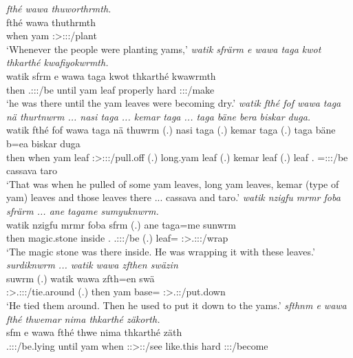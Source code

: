 \begin{exe}
	\emph{fthé wawa thuworthrmth.}\\
	\gll fthé wawa thuthrmth\\ 
	when yam \Stpl:\Sbj>\Stpl:\Obj:\Pst:\Dur/plant\\
	\trans `Whenever the people were planting yams,'
	\emph{watik sfrärm e wawa taga kwot thkarthé kwafiyokwrmth.}\\
	\gll watik sfrm e wawa taga kwot thkarthé kwawrmth\\ 
	then \Tsg.\Masc:\Sbj:\Pst:\Dur/be until yam leaf properly hard \Stpl:\Sbj:\Pst:\Dur/make\\
	\trans `he was there until the yam leaves were becoming dry.'
\largerpage
{} 
	\emph{watik fthé fof wawa taga nä thurtnwrm ... nasi taga ... kemar taga ... taga bäne bera biskar duga.}\\
	\gll watik fthé fof wawa taga nä thuwrm (.) nasi taga (.) kemar taga (.) taga bäne b=ea biskar duga\\ 
	then when {\Emph} yam leaf {\Indf} \Sg:\Sbj>\Stpl:\Obj:\Pst:\Dur/pull.off (.) long.yam leaf (.) kemar leaf (.) leaf \Recog.{\Abs} \Med=\Stpl:\Sbj:\Pst:\Ipfv/be cassava taro\\
	\trans `That was when he pulled of some yam leaves, long yam leaves, kemar (type of yam) leaves and those leaves there ... cassava and taro.'
	\emph{watik nzigfu mrmr foba sfrärm ... ane tagame sumyuknwrm.}\\
	\gll watik nzigfu mrmr foba sfrm (.) ane taga=me sunwrm\\ 
	then magic.stone inside \Dist.{\Abl} \Tsg.\Masc:\Sbj:\Pst:\Dur/be (.) {\Dem} leaf={\Ins} \Sg:\Sbj>\Tsg.\Masc:\Obj:\Pst:\Dur/wrap\\
	\trans `The magic stone was there inside. He was wrapping it with these leaves.'
	\emph{surdiknwrm ... watik wawa zfthen swäzin}\\
	\gll suwrm (.) watik wawa zfth=en swä\\ 
	\Sg:\Sbj>\Tsg.\Masc:\Obj:\Pst:\Dur/tie.around (.) then yam base={\Loc} \Stsg:\Sbj>\Tsg.\Masc:\Obj:\Iter/put.down\\
	\trans `He tied them around. Then he used to put it down to the yams.'
	\emph{sfthnm e wawa fthé thwemar nima thkarthé zäkorth.}\\
	\gll sfm e wawa fthé thwe nima thkarthé zäth\\ 
	\Tsg.\Masc:\Sbj:\Pst:\Dur/be.lying until yam when \Stsg:\Sbj:>\Stpl:\Obj:\Iter/see like.this hard \Stpl:\Sbj:\Pst:\Pfv/become\\

\end{exe}
